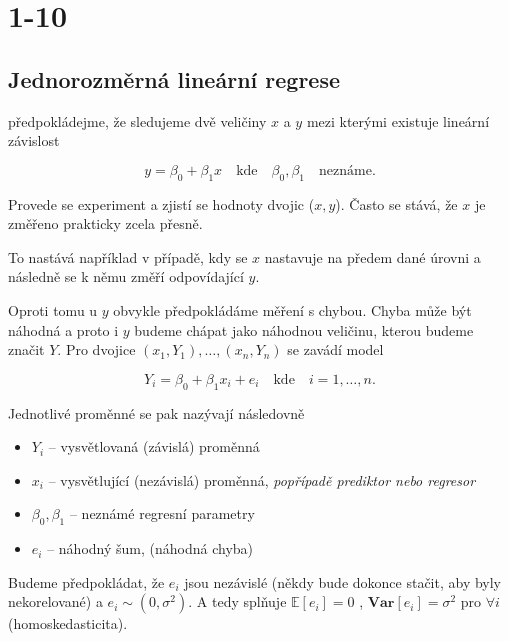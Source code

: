 \chapter{1-10}
\section{Jednorozměrná lineární regrese}

předpokládejme, že sledujeme dvě veličiny $ x $ a $ y $ mezi kterými existuje lineární závislost

\begin{equation}
	y = \beta_{0} + \beta_{1} x   \quad \text{kde} \quad \beta_{0}, \beta_{1} \quad \text{neznáme.} 
\end{equation}

Provede se experiment a zjistí se hodnoty dvojic ($ x , y $). Často se stává, že $ x $ je změřeno prakticky zcela přesně.

\begin{remark}
 To nastává například v případě, kdy se $ x $ nastavuje na předem dané úrovni a následně se k němu změří odpovídající $ y $.
\end{remark}
 
Oproti tomu u $ y $ obvykle předpokládáme měření s chybou. Chyba může být náhodná a proto i $ y $ budeme chápat jako náhodnou veličinu, kterou budeme značit $ Y $. Pro dvojice $ (x_{1}, Y_{1}), \dots ,( x_{n}, Y_{n} )$ se zavádí model

\begin{equation}\label{eq:lin_reg_model}
	Y_{i} = \beta_{0} + \beta_{1} x_{i} + e_{i} \quad \text{kde} \quad i = 1, \dots ,n .
\end{equation}

Jednotlivé proměnné se pak nazývají následovně

\begin{itemize}
  \item $ Y_{i} $ -- vysvětlovaná (závislá) proměnná
  \item $ x_{i} $ -- vysvětlující (nezávislá) proměnná, \textit{popřípadě prediktor nebo regresor}
  \item $ \beta_{0},\beta_{1} $ -- neznámé regresní parametry
  \item $ e_{i} $ -- náhodný šum, (náhodná chyba)
\end{itemize}

Budeme předpokládat, že $ e_{i} $ jsou nezávislé (někdy bude dokonce stačit, aby byly nekorelované) a $ e_{i} \sim (0,\sigma ^{2}) $. A tedy splňuje $ \mathbb{E} [ e_{i} ]  = 0 $ , $ \textbf{Var} [ e_{i} ] = \sigma ^{2} $ pro $ \forall i $ (homoskedasticita).

